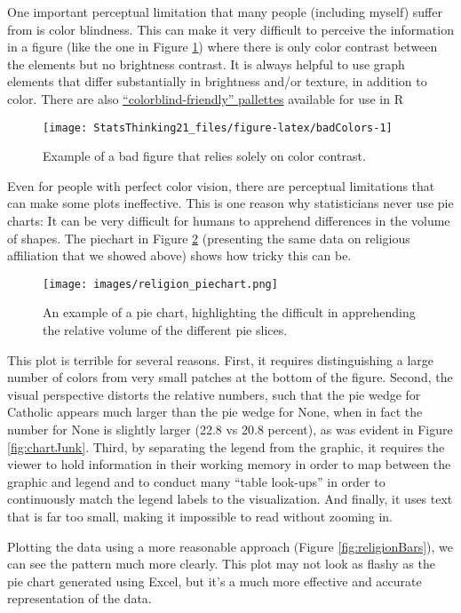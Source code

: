 \documentclass[]{book}
\theoremstyle{definition}
\theoremstyle{definition}
\theoremstyle{definition}
\theoremstyle{remark}
\begin{document}
One important perceptual limitation that many people (including myself)
suffer from is color blindness. This can make it very difficult to
perceive the information in a figure (like the one in Figure
\ref{fig:badColors}) where there is only color contrast between the
elements but no brightness contrast. It is always helpful to use graph
elements that differ substantially in brightness and/or texture, in
addition to color. There are also
\href{http://www.cookbook-r.com/Graphs/Colors_(ggplot2)/\#a-colorblind-friendly-palette}{``colorblind-friendly''
pallettes} available for use in R

\begin{figure}
\texttt{[image: StatsThinking21\_files/figure-latex/badColors-1]} \caption{Example of a bad figure that relies solely on color contrast.}\label{fig:badColors}
\end{figure}

Even for people with perfect color vision, there are perceptual
limitations that can make some plots ineffective. This is one reason why
statisticians never use pie charts: It can be very difficult for humans
to apprehend differences in the volume of shapes. The piechart in Figure
\ref{fig:pieChart} (presenting the same data on religious affiliation
that we showed above) shows how tricky this can be.

\begin{figure}
\centering
\texttt{[image: images/religion\_piechart.png]}
\caption{\label{fig:pieChart}An example of a pie chart, highlighting the
difficult in apprehending the relative volume of the different pie
slices.}
\end{figure}

This plot is terrible for several reasons. First, it requires
distinguishing a large number of colors from very small patches at the
bottom of the figure. Second, the visual perspective distorts the
relative numbers, such that the pie wedge for Catholic appears much
larger than the pie wedge for None, when in fact the number for None is
slightly larger (22.8 vs 20.8 percent), as was evident in Figure
\ref{fig:chartJunk}. Third, by separating the legend from the graphic,
it requires the viewer to hold information in their working memory in
order to map between the graphic and legend and to conduct many ``table
look-ups'' in order to continuously match the legend labels to the
visualization. And finally, it uses text that is far too small, making
it impossible to read without zooming in.

Plotting the data using a more reasonable approach (Figure
\ref{fig:religionBars}), we can see the pattern much more clearly. This
plot may not look as flashy as the pie chart generated using Excel, but
it's a much more effective and accurate representation of the data.
\end{document}
